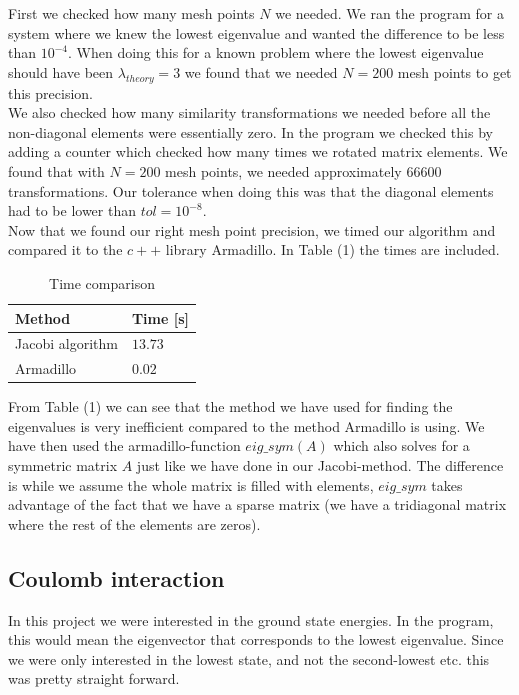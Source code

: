 \documentclass[%
 reprint,
 nobalancelastpage,
 amsmath,amssymb,
 aps,
]{revtex4-1}
\begin{document}
First we checked how many mesh points $N$ we needed. We ran the program for a system where we knew the lowest eigenvalue and wanted the difference to be less than $10^{-4}$. When doing this for a known problem where the lowest eigenvalue should have been $\lambda_{theory} = 3$ we found that we needed $N=200$ mesh points to get this precision.\\
We also checked how many similarity transformations we needed before all the non-diagonal elements were essentially zero. In the program we checked this by adding a counter which checked how many times we rotated matrix elements. We found that with $N= 200$ mesh points, we needed approximately $66600$ transformations. Our tolerance when doing this was that the diagonal elements had to be lower than $tol = 10^{-8}$.\\

Now that we found our right mesh point precision, we timed our algorithm and compared it to the $c++$ library Armadillo. In Table (1) the times are included.

\begin{table}[h]
\centering
\caption{Time comparison}
\label{my-label}
\begin{tabular}{|l|l|}
\hline
\textbf{Method}  & \textbf{Time {[}s{]}} \\ \hline
Jacobi algorithm & $13.73$               \\ \hline
Armadillo        & $0.02$                \\ \hline
\end{tabular}
\end{table}

From Table (1) we can see that the method we have used for finding the eigenvalues is very inefficient compared to the method Armadillo is using. We have then used the armadillo-function $eig\_ sym(A)$ which also solves for a symmetric matrix $A$ just like we have done in our Jacobi-method. The difference is while we assume the whole matrix is filled with elements, $eig\_sym$ takes advantage of the fact that we have a sparse matrix (we have a tridiagonal matrix where the rest of the elements are zeros).

\subsection{Coulomb interaction}
In this project we were interested in the ground state energies. In the program, this would mean the eigenvector that corresponds to the lowest eigenvalue. Since we were only interested in the lowest state, and not the second-lowest etc. this was pretty straight forward.\\
\end{document}
